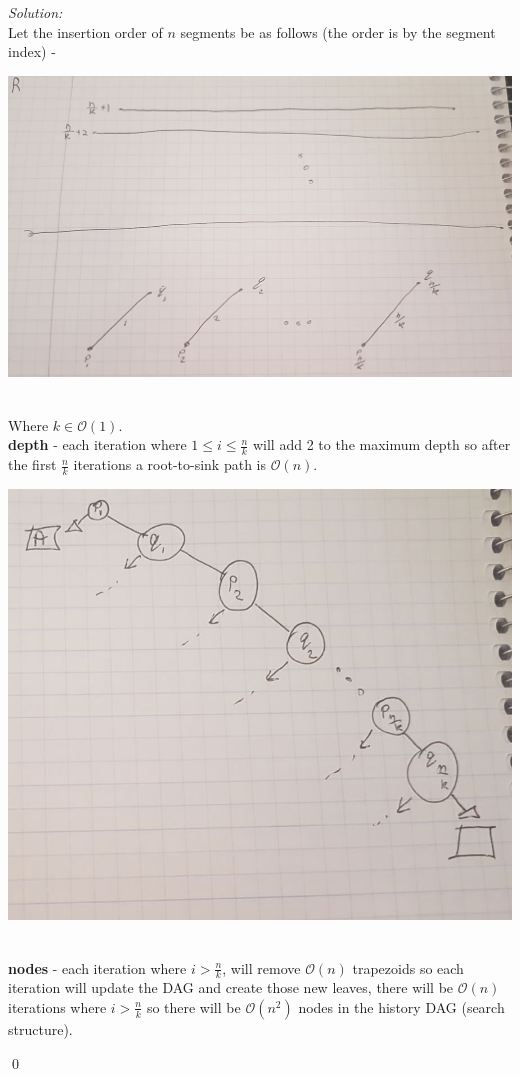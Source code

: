 \documentclass[a4paper, 8pt, oneside]{article}
\newenvironment{sol}
    {\emph{Solution:}
    }
    {
    \qed
    }
\begin{document}
\begin{enumerate}
\begin{sol} \\ 
	Let the insertion order of $n$ segments be as follows (the order is by the segment index) -\\
      \begin{minipage}{\linewidth}
            \centering
            \includegraphics[scale=0.2]{line}
        \end{minipage} \\
        Where $k \in \mathcal{O}(1)$.\\
        \textbf{depth} - each iteration where $1 \leq i \leq \frac{n}{k}$ will add 2 to the maximum depth so after the first $ \frac{n}{k}$ iterations a root-to-sink path is $\mathcal{O}(n)$.\\
           \begin{minipage}{\linewidth}
            \centering
            \includegraphics[scale=0.2]{dag}
        \end{minipage} \\
         \textbf{nodes} - each iteration where $i > \frac{n}{k}$, will remove $\mathcal{O}(n)$ trapezoids so each iteration will update the DAG and create those new leaves, there will be $\mathcal{O}(n)$ iterations where $i > \frac{n}{k}$ so there will be $\mathcal{O}(n^2)$ nodes in the history DAG (search structure).
\end{sol}
\end{enumerate}
\end{document}
